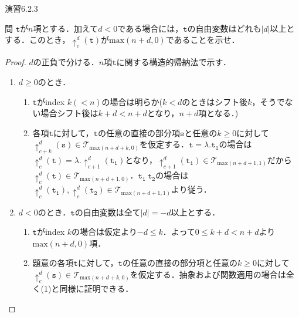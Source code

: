 \documentclass[9pt]{beamer}
\begin{document}
\begin{frame}{演習6.2.3}
\begin{alertblock}{問}
	$\mathtt{t}$が$n$項とする．加えて$d < 0$である場合には，$\mathtt{t}$の自由変数はどれも$\left|d\right|$以上とする．このとき，$\uparrow_{c}^{d}(\mathtt{t})$が$\mathrm{max}(n + d, 0)$であることを示せ．
\end{alertblock}
\begin{proof}
$d$の正負で分ける．$n$項$\mathtt{t}$に関する構造的帰納法で示す．
\begin{enumerate}
\item $d \geq 0$のとき．\begin{enumerate}\item$\mathtt{t}$がindex $k(< n)$の場合は明らか($k < d$のときはシフト後$k$，そうでない場合シフト後は$k + d < n + d$となり，$n + d$項となる．)
	\item 各項$\mathtt{t}$に対して，$\mathtt{t}$の任意の直接の部分項$\mathtt{s}$と任意の$k \geq 0$に対して$\uparrow_{c + k}^{d}(\mathtt{s})\in\mathcal{T}_{\mathrm{max}(n + d + k,0)}$を仮定する．$\mathtt{t = \lambda. t_{1}}$の場合は$\uparrow_{c}^{d}(\mathtt{t}) = \lambda.\uparrow_{c+ 1}^{d}(\mathtt{t_{1}})$となり，$\uparrow_{c+ 1}^{d}(\mathtt{t_{1}})\in\mathcal{T}_{\mathrm{max}(n + d+ 1,1)}$だから$\uparrow_{c}^{d}(\mathtt{t})\in\mathcal{T}_{\mathrm{max}(n + d+ 1,0)}$．$\mathtt{t_{1}\ t_{2}}$の場合は$\uparrow_{c}^{d}(\mathtt{t_{1}}), \uparrow_{c}^{d}(\mathtt{t_{2}})\in\mathcal{T}_{\mathrm{max}(n + d+ 1,1)}$より従う．\end{enumerate}
	\item $d < 0$のとき．$\mathtt{t}$の自由変数は全て$\left|d\right| = -d$以上とする．\begin{enumerate}
	\item $\mathtt{t}$がindex $k$の場合は仮定より$-d \leq k$．よって$0 \leq k + d < n + d$より$\mathrm{max}(n + d, 0)$項．
	\item 題意の各項$\mathtt{t}$に対して，$\mathtt{t}$の任意の直接の部分項と任意の$k \geq 0$に対して$\uparrow_{c}^{d}(\mathtt{s})\in\mathcal{T}_{\mathrm{max}(n + d + k, 0)}$を仮定する．抽象および関数適用の場合は全く(1)と同様に証明できる．
	\end{enumerate}
\end{enumerate}
\end{proof}
\end{frame}
\end{document}
